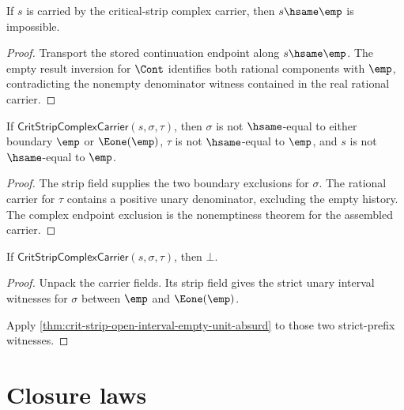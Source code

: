\begin{theorem}
\label{thm:crit-strip-complex-carrier-not-empty}
If $s$ is carried by the critical-strip complex carrier, then
$s\hsame\emp$ is impossible.
\end{theorem}
\begin{proof}
Transport the stored continuation endpoint along $s\hsame\emp$. The empty
result inversion for $\Cont$ identifies both rational components with
$\emp$, contradicting the nonempty denominator witness contained in the real
rational carrier.
\end{proof}

\begin{theorem}
\label{thm:crit-strip-complex-carrier-component-boundary-exclusion}
If \(\mathsf{CritStripComplexCarrier}(s,\sigma,\tau)\), then
\(\sigma\) is not \(\hsame\)-equal to either boundary \(\emp\) or
\(\Eone(\emp)\), \(\tau\) is not \(\hsame\)-equal to \(\emp\), and \(s\) is
not \(\hsame\)-equal to \(\emp\).
\end{theorem}
\begin{proof}
The strip field supplies the two boundary exclusions for \(\sigma\). The
rational carrier for \(\tau\) contains a positive unary denominator, excluding
the empty history. The complex endpoint exclusion is the nonemptiness theorem
for the assembled carrier.
\end{proof}

\begin{theorem}
\label{thm:crit-strip-complex-carrier-empty}
If $\mathsf{CritStripComplexCarrier}(s,\sigma,\tau)$, then $\bot$.
\end{theorem}
\begin{proof}
Unpack the carrier fields. Its strip field gives the strict unary interval
witnesses for $\sigma$ between $\emp$ and $\Eone(\emp)$.

Apply \autoref{thm:crit-strip-open-interval-empty-unit-absurd} to those two
strict-prefix witnesses.
\end{proof}

\section{Closure laws}

